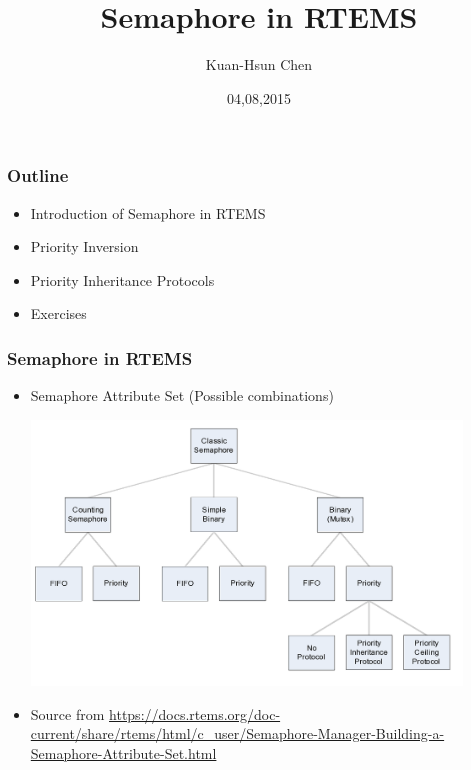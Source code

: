 \documentclass[t]{beamer}
\title{Semaphore in RTEMS}
\author{Kuan-Hsun Chen}
\institute{LS 12, TU Dortmund}
\date{04,08,2015}
\begin{document}
\maketitle

\begin{frame}
\frametitle{Outline}

\begin{itemize}

\item Introduction of Semaphore in RTEMS
\label{sec-1-1}%

\item Priority Inversion

\item Priority Inheritance Protocols

\item Exercises 

\end{itemize} %
\end{frame}

\begin{frame}
\frametitle{Semaphore in RTEMS}
\label{sec-2}
\begin{itemize}

\item Semaphore Attribute Set (Possible combinations)
\begin{center}
\includegraphics[width=0.9\textwidth]{semaphore_attributes}
\end{center}
\item \scriptsize Source from \url{https://docs.rtems.org/doc-current/share/rtems/html/c_user/Semaphore-Manager-Building-a-Semaphore-Attribute-Set.html}
\end{itemize} %

\end{frame}
\end{document}
